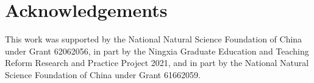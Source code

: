 \documentclass{bmvc2k}
\begin{document}
\section{Acknowledgements}
This work was supported by the National Natural Science Foundation of China under Grant 62062056, in part by the Ningxia Graduate Education and Teaching Reform Research and Practice Project 2021, and in part by the National Natural Science Foundation of China under Grant 61662059.





































\end{document}
